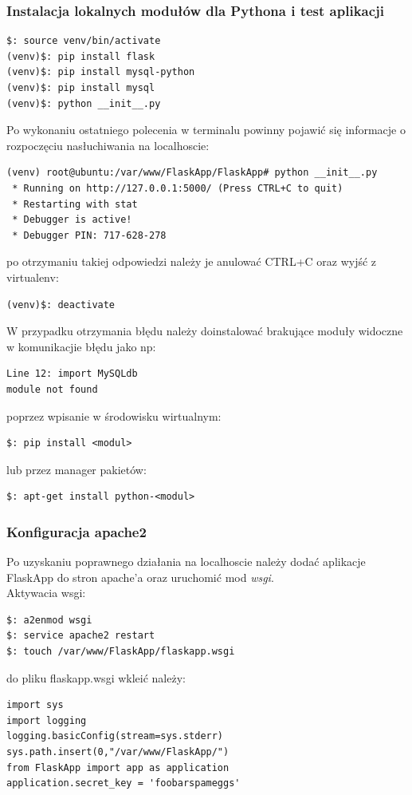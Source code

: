 \documentclass[12pt,a4paper]{article}
\begin{document}
\subsubsection{Instalacja lokalnych modułów dla Pythona i test aplikacji}
\begin{lstlisting}
$: source venv/bin/activate
(venv)$: pip install flask
(venv)$: pip install mysql-python
(venv)$: pip install mysql 
(venv)$: python __init__.py
\end{lstlisting}
Po wykonaniu ostatniego polecenia w terminalu powinny pojawić się informacje o rozpoczęciu nasłuchiwania na localhoscie:
\begin{lstlisting}
(venv) root@ubuntu:/var/www/FlaskApp/FlaskApp# python __init__.py 
 * Running on http://127.0.0.1:5000/ (Press CTRL+C to quit)
 * Restarting with stat
 * Debugger is active!
 * Debugger PIN: 717-628-278
\end{lstlisting}
po otrzymaniu takiej odpowiedzi należy je anulować CTRL+C oraz wyjść z virtualenv:
\begin{lstlisting}
(venv)$: deactivate
\end{lstlisting}
W przypadku otrzymania błędu należy doinstalować brakujące moduły widoczne w komunikacjie błędu jako np: 
\begin{lstlisting}
Line 12: import MySQLdb 
module not found
\end{lstlisting}
poprzez wpisanie w środowisku wirtualnym:
\begin{lstlisting}
$: pip install <modul>
\end{lstlisting} 
lub przez manager pakietów:
\begin{lstlisting}
$: apt-get install python-<modul>
\end{lstlisting}

\subsubsection{Konfiguracja apache2}

Po uzyskaniu poprawnego działania na localhoscie należy dodać aplikacje FlaskApp do stron apache'a oraz uruchomić mod \textit{wsgi}.\\

Aktywacia wsgi:
\begin{lstlisting}
$: a2enmod wsgi
$: service apache2 restart
$: touch /var/www/FlaskApp/flaskapp.wsgi
\end{lstlisting}
do pliku flaskapp.wsgi wkleić należy:
\begin{lstlisting}
import sys
import logging
logging.basicConfig(stream=sys.stderr)
sys.path.insert(0,"/var/www/FlaskApp/")
from FlaskApp import app as application
application.secret_key = 'foobarspameggs'
\end{lstlisting}
\newpage
\end{document}
